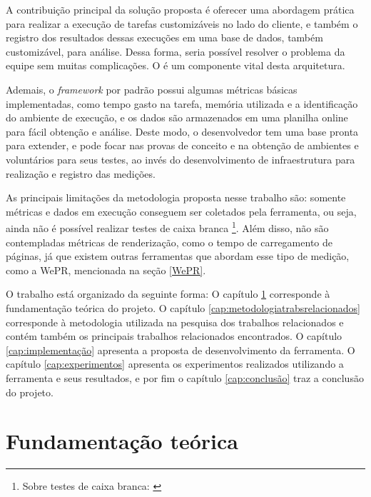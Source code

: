 \documentclass[12pt]{tcc}
\begin{document}
A contribuição principal da solução proposta é oferecer uma abordagem prática para realizar a execução de tarefas customizáveis no lado do cliente, e também o registro dos resultados dessas execuções em uma base de dados, também customizável, para análise. Dessa forma, seria possível resolver o problema da equipe sem muitas complicações. O  é um componente vital desta arquitetura.

Ademais, o \emph{framework} por padrão possui algumas métricas básicas implementadas, como tempo gasto na tarefa, memória utilizada e a identificação do ambiente de execução, e os dados são armazenados em uma planilha online para fácil obtenção e análise. Deste modo, o desenvolvedor tem uma base pronta para extender, e pode focar nas provas de conceito e na obtenção de ambientes e voluntários para seus testes, ao invés do desenvolvimento de infraestrutura para realização e registro das medições.

As principais limitações da metodologia proposta nesse trabalho são: somente métricas e dados em execução conseguem ser coletados pela ferramenta, ou seja, ainda não é possível realizar testes de caixa branca \footnote{Sobre testes de caixa branca: \citep[Capítulo 21]{Sommerville2015Software}}. Além disso, não são contempladas métricas de renderização, como o tempo de carregamento de páginas, já que existem outras ferramentas que abordam esse tipo de medição, como a WePR, mencionada na seção \ref{WePR}.

O trabalho está organizado da seguinte forma: O capítulo \ref{cap:fundamentacao_teorica} corresponde à fundamentação teórica do projeto. O capítulo \ref{cap:metodologiatrabsrelacionados} corresponde à metodologia utilizada na pesquisa dos trabalhos relacionados e contém também os principais trabalhos relacionados encontrados.
O capítulo \ref{cap:implementação} apresenta a proposta de desenvolvimento da ferramenta. O capítulo \ref{cap:experimentos} apresenta os experimentos realizados utilizando a ferramenta e seus resultados, e por fim o capítulo \ref{cap:conclusão} traz a conclusão do projeto.


\chapter{Fundamentação teórica}
\label{cap:fundamentacao_teorica}

\end{document}
